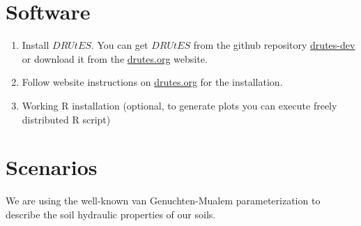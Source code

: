 \documentclass[
10pt, %
a4paper, %
oneside, %
headinclude,footinclude, %
BCOR5mm, %
]{scrartcl}
\begin{document}
\section{Software}

\begin{enumerate}
\item Install $DRUtES$. You can get $DRUtES$ from the github repository \href{https://github.com/michalkuraz/drutes-dev/} {drutes-dev} or download it from the \href{http://drutes.org/public/?core=account}{drutes.org} website. 
\item Follow website instructions on \href{http://drutes.org/public/?core=account}{drutes.org} for the installation.
\item Working R installation (optional, to generate plots you can execute freely distributed R script) 
\end{enumerate}

\newpage
\section{Scenarios}

We are using the well-known van Genuchten-Mualem parameterization to describe the soil hydraulic properties of our soils. 
\end{document}
